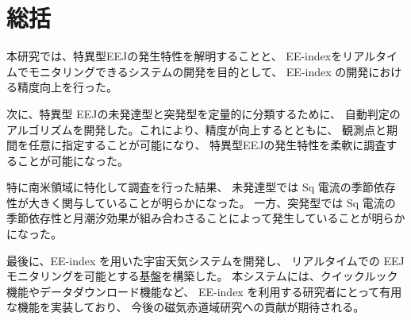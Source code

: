 \section{総括}

本研究では、特異型EEJの発生特性を解明することと、
EE-indexをリアルタイムでモニタリングできるシステムの開発を目的として、
EE-index の開発における精度向上を行った。

次に、特異型 EEJの未発達型と突発型を定量的に分類するために、
自動判定のアルゴリズムを開発した。これにより、精度が向上するとともに、
観測点と期間を任意に指定することが可能になり、
特異型EEJの発生特性を柔軟に調査することが可能になった。

特に南米領域に特化して調査を行った結果、
未発達型では Sq 電流の季節依存性が大きく関与していることが明らかになった。
一方、突発型では Sq 電流の季節依存性と月潮汐効果が組み合わさることによって発生していることが明らかになった。

最後に、EE-index を用いた宇宙天気システムを開発し、
リアルタイムでの EEJ モニタリングを可能とする基盤を構築した。
本システムには、クイックルック機能やデータダウンロード機能など、
EE-index を利用する研究者にとって有用な機能を実装しており、
今後の磁気赤道域研究への貢献が期待される。